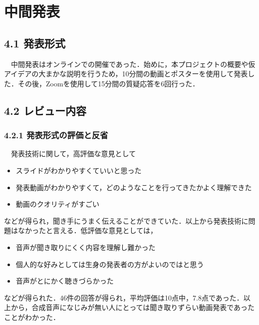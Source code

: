 \chapter{中間発表}

\section{4.1 発表形式}
　中間発表はオンラインでの開催であった．始めに，本プロジェクトの概要や仮アイデアの大まかな説明を行うため，10分間の動画とポスターを使用して発表した．その後，Zoomを使用して15分間の質疑応答を6回行った．

\section{4.2 レビュー内容}
\subsection{4.2.1 発表形式の評価と反省}
　発表技術に関して，高評価な意見として
\begin{itemize}
    \item スライドがわかりやすくていいと思った
    \item 発表動画がわかりやすくて，どのようなことを行ってきたかよく理解できた
    \item 動画のクオリティがすごい
\end{itemize}
などが得られ，聞き手にうまく伝えることができていた．以上から発表技術に問題はなかったと言える．低評価な意見としては，
\begin{itemize}
    \item 音声が聞き取りにくく内容を理解し難かった
    \item 個人的な好みとしては生身の発表者の方がよいのではと思う
    \item 音声がとにかく聴きづらかった
\end{itemize}
などが得られた．46件の回答が得られ，平均評価は10点中，7.8点であった．以上から，合成音声になじみが無い人にとっては聞き取りずらい動画発表であったことがわかった．

